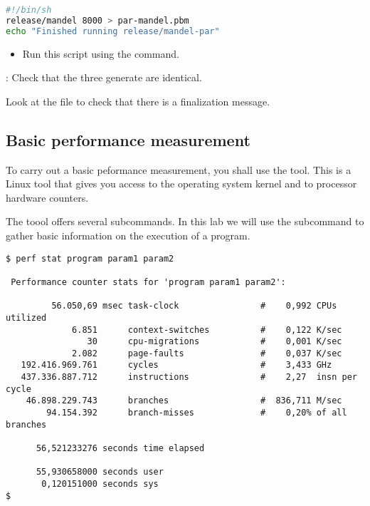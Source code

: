 \begin{enumerate}
\begin{lstlisting}[language=bash,title={Archivo run-par-mandel.sh},frame=single]
#!/bin/sh
release/mandel 8000 > par-mandel.pbm
echo "Finished running release/mandel-par"
\end{lstlisting}
    \begin{itemize}
      \item Run this script using the  command.
    \end{itemize}
\end{enumerate}


: 
Check that the three generate  are identical.

Look at the  file to check that there is a finalization message.

\subsection{Basic performance measurement}

To carry out a basic peformance measurement, you shall use the  tool.
This is a Linux tool that gives you access to the operating system kernel
and to processor hardware counters.

The  toool offers several subcommands.
In this lab we will use the  subcommand to gather
basic information on the execution of a program.

\begin{lstlisting}[style=terminal,basicstyle=\ttfamily]
$ perf stat program param1 param2

 Performance counter stats for 'program param1 param2':

         56.050,69 msec task-clock                #    0,992 CPUs utilized          
             6.851      context-switches          #    0,122 K/sec                  
                30      cpu-migrations            #    0,001 K/sec                  
             2.082      page-faults               #    0,037 K/sec                  
   192.416.969.761      cycles                    #    3,433 GHz                    
   437.336.887.712      instructions              #    2,27  insn per cycle         
    46.898.229.743      branches                  #  836,711 M/sec                  
        94.154.392      branch-misses             #    0,20% of all branches        

      56,521233276 seconds time elapsed

      55,930658000 seconds user
       0,120151000 seconds sys
$
\end{lstlisting}

